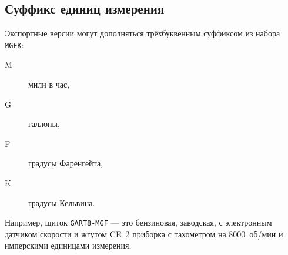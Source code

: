 \subsection{Суффикс единиц измерения}
Экспортные версии могут дополняться трёхбуквенным суффиксом из набора \texttt{MGFK}:
\begin{description}
    \item[M] мили в час,
    \item[G] галлоны,
    \item[F] градусы Фаренгейта,
    \item[K] градусы Кельвина.
\end{description}
Например, щиток \texttt{GART8-MGF} — это бензиновая, заводская, с электронным датчиком скорости и жгутом CE~2 приборка с тахометром на 8000~об/мин и имперскими единицами измерения.

